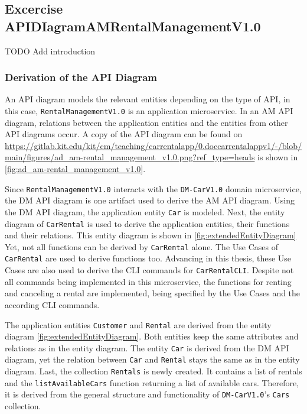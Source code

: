 \subsection{Excercise APIDIagramAMRentalManagementV1.0}
TODO Add introduction
\subsubsection*{Derivation of the API Diagram}
An API diagram models the relevant entities depending on the type of API, in this case, \hfill \linebreak \texttt{RentalManagementV1.0} is an application microservice.
In an AM API diagram, relations between the application entities and the entities from other API diagrams occur.
A copy of the API diagram can be found on \url{https://gitlab.kit.edu/kit/cm/teaching/carrentalapp/0.doccarrentalappv1/-/blob/main/figures/ad_am-rental_management_v1.0.png?ref_type=heads} is shown in \autoref*{fig:ad_am-rental_management_v1.0}.

Since \texttt{RentalManagementV1.0} interacts with the \texttt{DM-CarV1.0} domain microservice, the DM API diagram is one artifact used to derive the AM API diagram.
Using the DM API diagram, the application entity \texttt{Car} is modeled.
Next, the entity diagram of \texttt{CarRental} is used to derive the application entities, their functions and their relations.
This entity diagram is shown in \autoref{fig:extendedEntityDiagram}
Yet, not all functions can be derived by \texttt{CarRental} alone.
The Use Cases of \texttt{CarRental} are used to derive functions too.
Advancing in this thesis, these Use Cases are also used to derive the CLI commands for \texttt{CarRentalCLI}.
Despite not all commands being implemented in this microservice, the functions for renting and canceling a rental are implemented, being specified by the Use Cases and the according CLI commands.

The application entities \texttt{Customer} and \texttt{Rental} are derived from the entity diagram \autoref{fig:extendedEntityDiagram}.
Both entities keep the same attributes and relations as in the entity diagram.
The entity \texttt{Car} is derived from the DM API diagram, yet the relation between \texttt{Car} and \texttt{Rental} stays the same as in the entity diagram.
Last, the collection \texttt{Rentals} is newly created.
It contains a list of rentals and the \texttt{listAvailableCars} function returning a list of available cars.
Therefore, it is derived from the general structure and functionality of \texttt{DM-CarV1.0}'s \texttt{Cars} collection.

